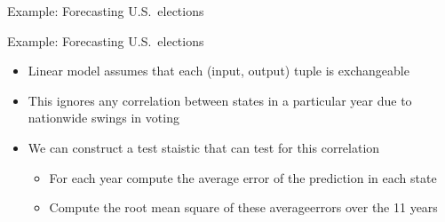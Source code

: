 \begin{frame}{Example: Forecasting U.S.\ elections}
  \begin{center}
  \end{center}
\end{frame}

\begin{frame}{Example: Forecasting U.S.\ elections}
  \begin{itemize}
    \item Linear model assumes that each (input, output) tuple is exchangeable
    \vspace{\baselineskip}
    \pause
    \item This ignores any correlation between states in a particular year due to nationwide swings in voting
    \vspace{\baselineskip}
    \pause
    \item We can construct a test staistic that can test for this correlation
    \begin{itemize}
      \item For each year compute the average error of the prediction in each state
      \item Compute the root mean square of these averageerrors over the 11 years
    \end{itemize}
  \end{itemize}
\end{frame}

